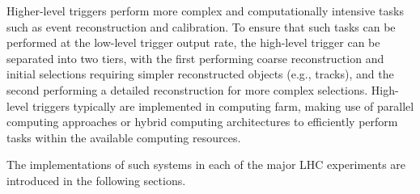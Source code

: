 Higher-level triggers perform more complex and computationally intensive tasks such as event reconstruction and calibration. 
To ensure that such tasks can be performed at the low-level trigger output rate, the high-level trigger can be separated into two tiers, with the first performing coarse reconstruction and initial selections requiring simpler reconstructed objects (e.g., tracks), and the second performing a detailed reconstruction for more complex selections. 
High-level triggers typically are implemented in computing farm, making use of parallel computing approaches or hybrid computing architectures to efficiently perform tasks within the available computing resources.

The implementations of such systems in each of the major LHC experiments are introduced in the following sections. 





